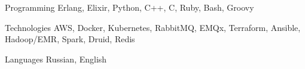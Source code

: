 

\begin{cvskills}

  \cvskill
    {Programming} %
    {Erlang, Elixir, Python, C++, C, Ruby, Bash, Groovy} %

  \cvskill
    {Technologies} %
    {AWS, Docker, Kubernetes, RabbitMQ, EMQx, Terraform, Ansible, Hadoop/EMR, Spark, Druid, Redis} %

  \cvskill
    {Languages} %
    {Russian, English} %

\end{cvskills}

